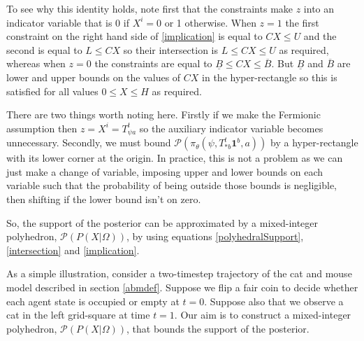 \documentclass{article}
\begin{document}
To see why this identity holds, note first that the constraints make $z$ into an indicator variable that is 0 if $X^i=0$ or 1 otherwise. When $z=1$ the first constraint on the right hand side of \eqref{implication} is equal to $CX \le U$ and the second is equal to $L \le CX$ so their intersection is $L \le  CX \le U$ as required, whereas when $z=0$ the constraints are equal to $\underline{B} \le CX \le \overline{B}$. But $\underline{B}$ and $\overline{B}$ are lower and upper bounds on the values of $CX$ in the hyper-rectangle so this is satisfied for all values $0 \le X \le H$ as required. 

There are two things worth noting here. Firstly if we make the Fermionic assumption then $z = X^i = T^t_{\psi a}$ so the auxiliary indicator variable becomes unnecessary. Secondly, we must bound $\mathcal{P}(\pi_\theta(\psi,T^t_{*b}\mathbf{1}^b,a))$ by a hyper-rectangle with its lower corner at the origin. In practice, this is not a problem as we can just make a change of variable, imposing upper and lower bounds on each variable such that the probability of being outside those bounds is negligible, then shifting if the lower bound isn't on zero.

So, the support of the posterior can be approximated by a mixed-integer polyhedron, $\mathcal{P}(P(X|\Omega))$, by using equations \eqref{polyhedralSupport}, \eqref{intersection} and \eqref{implication}.

As a simple illustration, consider a two-timestep trajectory of the cat and mouse model described in section \ref{abmdef}. Suppose we flip a fair coin to decide whether each agent state is occupied or empty at $t=0$. Suppose also that we observe a cat in the left grid-square at time $t=1$. Our aim is to construct a mixed-integer polyhedron, $\mathcal{P}(P(X|\Omega))$, that bounds the support of the posterior.
\end{document}
